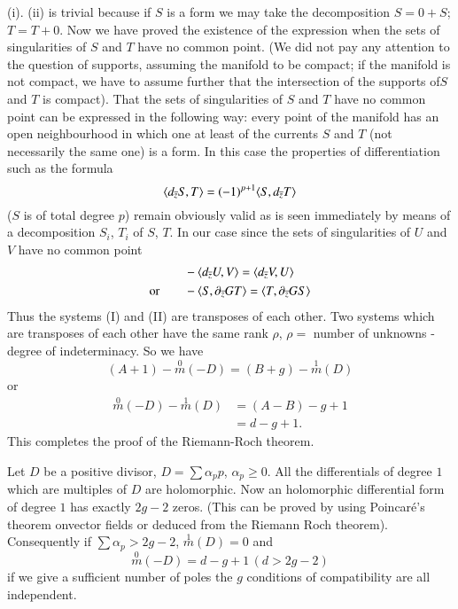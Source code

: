 (i). (ii) is trivial because if $S$ is a form we may take the
decomposition $S=0+S$; $T=T+0$. Now we have proved the existence of
the expression when the sets of singularities of $S$ and $T$ have no
common point. (We did not pay any attention to the question of
supports, assuming the manifold to be compact; if the manifold is not
compact, we have to assume further that the intersection of the
supports of\pageoriginale $S$ and $T$ is compact). That the sets of
singularities of $S$ and $T$ have no common point can be expressed in
the following way: every point of the manifold has an open
neighbourhood in which one at least of the currents $S$ and $T$ (not
necessarily the same one) is a form. In this case the properties of
differentiation such as the formula
$$
\langle d_{\overline{z}}S,T\rangle =(-1)^{p+1}\langle S,d_{\overline{z}}T\rangle
$$
($S$ is of total degree $p$) remain obviously valid as is seen
immediately by means of a decomposition $S_{i}$, $T_{i}$ of $S$,
$T$. In our case since the sets of singularities of $U$ and $V$ have
no common point 
\begin{align*}
& -\langle d_{\overline{z}}U,V\rangle=\langle d_{\overline{z}}V,U\rangle\\
\text{or}\qquad &-\langle S,\partial_{\overline{z}}GT\rangle=\langle
T,\partial_{\overline{z}}GS\rangle 
\end{align*}
Thus the systems (I) and (II) are transposes of each other. Two
systems which are transposes of each other have the same rank $\rho$,
$\rho=$ number of unknowns - degree of indeterminacy. So we have
$$
(A+1)-\overset{0}{m}(-D)=(B+g)-\overset{1}{m}(D)
$$
or
\begin{align*}
\overset{0}{m}(-D)-\overset{1}{m}(D) &= (A-B)-g+1\\
 &= d-g+1.
\end{align*}
This completes the proof of the Riemann-Roch theorem.

Let $D$ be a positive divisor, $D=\sum\alpha_{p}p$, $\alpha_{p}\geq
0$. All the differentials of degree $1$ which are multiples of $D$ are
holomorphic. Now an holomorphic differential form of degree $1$ has
exactly $2g-2$ zeros. (This can be proved by using Poincar\'e's
theorem on\pageoriginale vector fields or deduced from the Riemann
Roch theorem). Consequently if $\sum \alpha_{p}>2g-2$,
$\overset{1}{m}(D)=0$ and
$$
\overset{0}{m}(-D)=d-g+1\,(d>2g-2)
$$
\iec if we give a sufficient number of poles the $g$ conditions of
compatibility are all independent.


